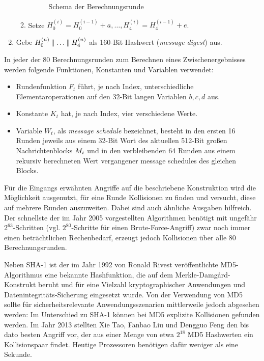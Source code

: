 \begin{enumerate}
\begin{enumerate}
\begin{figure}[h]
      \caption{Schema der Berechnungsrunde}
    \end{figure}
  \item Setze $H_0^{(i)} = H_0^{(i-1)} + a, \dots, H_4^{(i)} = H_4^{(i-1)} + e$.
  \end{enumerate}
\item Gebe $H_0^{(n)} \mathbin{\|} \dots \mathbin{\|} H_4^{(n)}$ als 160-Bit
  Hashwert (\emph{message digest}) aus. 
\end{enumerate} 

In jeder der 80 Berechnungsrunden zum Berechnen eines
Zwischenergebnisses werden folgende Funktionen, Konstanten und Variablen
verwendet: 
\begin{itemize}
\item Rundenfunktion $F_{t}$ führt, je nach Index, unterschiedliche
  Elementaroperationen auf den 32-Bit langen Variablen $b, c, d$ aus.
\item Konstante $K_{t}$ hat, je nach Index, vier verschiedene Werte.
\item Variable $W_{t}$, als \emph{message schedule} bezeichnet, besteht
  in den ersten 16 Runden jeweils aus einem 32-Bit Wort des aktuellen
  512-Bit großen Nachrichtenblocks $M_{i}$ und in den
  verbleibenden 64 Runden aus einem rekursiv berechneten Wert
  vergangener message schedules des gleichen Blocks.
\end{itemize}

Für die Eingangs erwähnten Angriffe auf die beschriebene Konstruktion
wird die Möglichkeit ausgenutzt, für eine Runde Kollisionen zu finden
und versucht, diese auf mehrere Runden auszuweiten. Dabei sind auch
ähnliche Ausgaben hilfreich. Der schnellste der im Jahr 2005
vorgestellten Algorithmen benötigt mit ungefähr $2^{63}$-Schritten
(vgl. $2^{80}$-Schritte für einen Brute-Force-Angriff) zwar noch immer
einen beträchtlichen Rechenbedarf, erzeugt jedoch Kollisionen über alle
80 Berechnungsrunden.

Neben SHA-1 ist der im Jahr 1992 von Ronald Rivest veröffentlichte
MD5-Algorithmus \indexMDFive eine bekannte Hashfunktion, die auf dem
Merkle-Damgård-Konstrukt beruht und für eine Vielzahl kryptographischer
Anwendungen und Datenintegritäts-Sicherung eingesetzt wurde. Von der
Verwendung von MD5 sollte für sicherheitsrelevante Anwendungsszenarien
mittlerweile jedoch abgesehen werden: Im Unterschied zu SHA-1 können bei
MD5 explizite Kollisionen gefunden werden. Im Jahr 2013 stellten Xie
Tao, Fanbao Liu und Dengguo Feng den bis dato besten Angriff vor, der
aus einer Menge von etwa $2^{18}$ MD5 Hashwerten ein Kollisionspaar
findet. Heutige Prozessoren benötigen dafür weniger als eine Sekunde.

